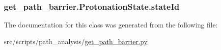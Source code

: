 \hypertarget{classget__path__barrier_1_1_protonation_state_a0887568cf1ad7ef61b03b9e9e0438186}{
\subsubsection[{state\-Id}]{\setlength{\rightskip}{0pt plus 5cm}get\-\_\-path\-\_\-barrier.\-Protonation\-State.\-state\-Id}}\label{classget__path__barrier_1_1_protonation_state_a0887568cf1ad7ef61b03b9e9e0438186}


The documentation for this class was generated from the following file\-:\begin{DoxyCompactItemize}
\item 
src/scripts/path\-\_\-analysis/\hyperlink{get__path__barrier_8py}{get\-\_\-path\-\_\-barrier.\-py}\end{DoxyCompactItemize}
